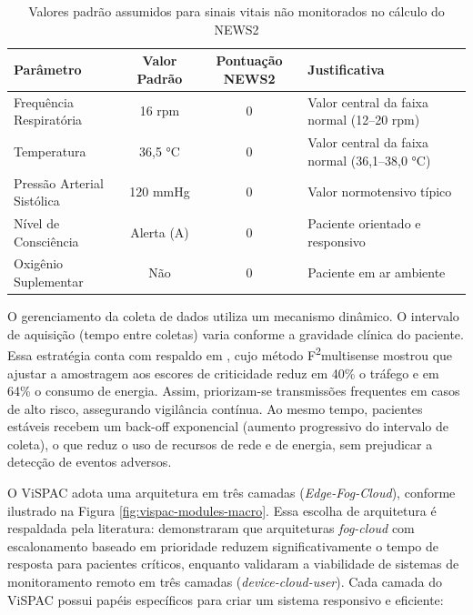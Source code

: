 \documentclass[twoside,english,brazilian]{UNISINOSmonografia}
\begin{document}
\begin{table}[!ht]
\centering
\caption{Valores padrão assumidos para sinais vitais não monitorados no cálculo do NEWS2}
\label{tab:news2_defaults}
\footnotesize
\begin{tabular}{|l|c|c|p{5cm}|}
\hline
\textbf{Parâmetro} & \textbf{Valor Padrão} & \textbf{Pontuação NEWS2} & \textbf{Justificativa} \\ \hline
Frequência Respiratória & 16 rpm & 0 & Valor central da faixa normal (12--20 rpm) \\ \hline
Temperatura & 36,5 °C & 0 & Valor central da faixa normal (36,1--38,0 °C) \\ \hline
Pressão Arterial Sistólica & 120 mmHg & 0 & Valor normotensivo típico \\ \hline
Nível de Consciência & Alerta (A) & 0 & Paciente orientado e responsivo \\ \hline
Oxigênio Suplementar & Não & 0 & Paciente em ar ambiente \\ \hline
\end{tabular}
\end{table}

O gerenciamento da coleta de dados utiliza um mecanismo dinâmico. O intervalo de aquisição (tempo entre coletas) varia conforme a gravidade clínica do paciente. Essa estratégia conta com respaldo em \cite{Shankani2025}, cujo método F\textsuperscript{2}multisense mostrou que ajustar a amostragem aos escores de criticidade reduz em 40\% o tráfego e em 64\% o consumo de energia. Assim, priorizam-se transmissões frequentes em casos de alto risco, assegurando vigilância contínua. Ao mesmo tempo, pacientes estáveis recebem um back-off exponencial (aumento progressivo do intervalo de coleta), o que reduz o uso de recursos de rede e de energia, sem prejudicar a detecção de eventos adversos.

O ViSPAC adota uma arquitetura em três camadas (\textit{Edge-Fog-Cloud}), conforme ilustrado na Figura \ref{fig:vispac-modules-macro}. Essa escolha de arquitetura é respaldada pela literatura: \cite{CASSEL2024} demonstraram que arquiteturas \textit{fog-cloud} com escalonamento baseado em prioridade reduzem significativamente o tempo de resposta para pacientes críticos, enquanto \cite{MOHAPATRA2025} validaram a viabilidade de sistemas de monitoramento remoto em três camadas (\textit{device-cloud-user}). Cada camada do ViSPAC possui papéis específicos para criar um sistema responsivo e eficiente:
\end{document}
